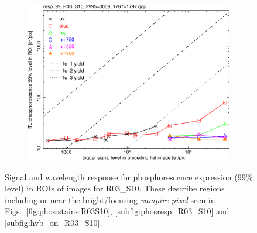 \begin{figure}[!htbp]
\centering
\begin{subfigure}{0.45\textwidth}    
  \centering
  \includegraphics[width=\textwidth]{figures/phosphorescence-survey/phos_resp/resp_99_R03_S10_2995-3009_1767-1797.png}    
\end{subfigure}
\newline
\caption{Signal and wavelength response for phosphorescence expression (99\% level) in ROIs of images for R03\_S10. These describe regions including or near the bright/focusing {\it vampire pixel} seen in Figs.~\ref{fig:phos:stains:R03S10}, \ref{subfig:phosresp_R03_S10} and \ref{subfig:hvb_on_R03_S10}.}
\label{fig:phos:resp:R03S10}
\end{figure}

